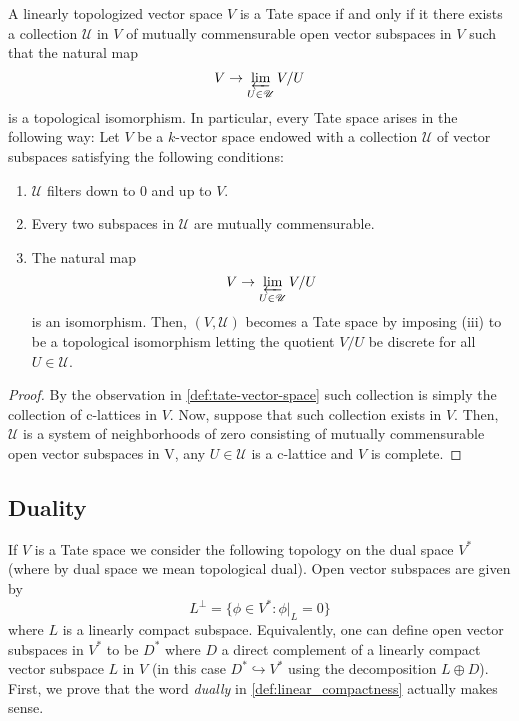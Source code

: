 \begin{proposition}\label{prop:characterization-of-tate-spaces-as-inverse-limits}
	A linearly topologized vector space $V$ is a Tate space if and only if it there exists a collection $\mathscr{U}$ in $V$ of mutually commensurable open vector subspaces in $V$ such that the natural map
	\[
		V \to \varprojlim_{U \in \mathscr{U}} V/U
	\]
	is a topological isomorphism. In particular, every Tate space arises in the following way: Let $V$ be a $k$-vector space endowed with a collection $\mathscr{U}$ of vector subspaces satisfying the following conditions:
	\begin{enumerate}[label = (\roman*)]
		\item $\mathscr{U}$ filters down to $0$ and up to $V$.
		\item Every two subspaces in $\mathscr{U}$ are mutually commensurable.
		\item The natural map
		\[
			V \to \varprojlim_{U\in \mathscr{U}} V/U
		\]
		is an isomorphism. Then, $(V, \mathscr{U})$ becomes a Tate space by imposing (iii) to be a topological isomorphism letting the quotient $V/U$ be discrete for all $U \in \mathscr{U}$.
	\end{enumerate}
	
\end{proposition}
\begin{proof}
	By the observation in \cref{def:tate-vector-space} such collection is simply the collection of c-lattices in $V$. Now, suppose that such collection exists in $V$. Then, $\mathscr{U}$ is a system of neighborhoods of zero consisting of mutually commensurable open vector subspaces in V, any $U \in \mathscr{U}$ is a c-lattice and $V$ is complete.
\end{proof}


\subsection{Duality}
If $V$ is a Tate space we consider the following topology on the dual space $V^{*}$ (where by dual space we mean topological dual). Open vector subspaces are given by
\[
	L^{\perp} = \{\phi\in V^{*} \colon \phi\lvert_{L} = 0\}
\]
where $L$ is a linearly compact subspace. Equivalently, one can define open vector subspaces in $V^{*}$ to be $D^{*}$ where $D$ a direct complement of a linearly compact vector subspace $L$ in $V$ (in this case $D^{*} \hookrightarrow V^{*}$ using the decomposition $L\oplus D$).  \\
First, we prove that the word \emph{dually} in \cref{def:linear_compactness} actually makes sense. 

